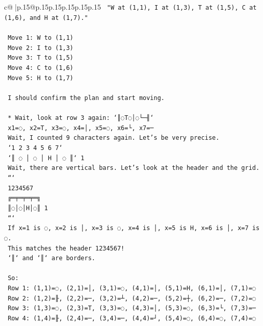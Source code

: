 \documentclass{article}
\begin{document}
{\begin{supertabular}{c@{$\;$}|p{.15\linewidth}@{}p{.15\linewidth}p{.15\linewidth}p{.15\linewidth}p{.15\linewidth}p{.15\linewidth}}
{{{\texttt{        "W at (1,1), I at (1,3), T at (1,5), C at (1,6), and H at (1,7)."} \\
\\ 
\texttt{        Move 1: W to (1,1)} \\
\texttt{        Move 2: I to (1,3)} \\
\texttt{        Move 3: T to (1,5)} \\
\texttt{        Move 4: C to (1,6)} \\
\texttt{        Move 5: H to (1,7)} \\
\\ 
\texttt{        I should confirm the plan and start moving.} \\
\\ 
\texttt{    *   Wait, look at row 3 again: `║◌T◌│◌└─╢`} \\
\texttt{        x1=◌, x2=T, x3=◌, x4=│, x5=◌, x6=└, x7=─} \\
\texttt{        Wait, I counted 9 characters again. Let's be very precise.} \\
\texttt{        `1 2 3 4 5 6 7`} \\
\texttt{        `║ ◌ │ ◌ │ H │ ◌ ║` 1} \\
\texttt{        Wait, there are vertical bars. Let's look at the header and the grid.} \\
\texttt{        ```} \\
\texttt{         1234567} \\
\texttt{        ╔═╤═╤═╤═╗} \\
\texttt{        ║◌│◌│H│◌║ 1} \\
\texttt{        ```} \\
\texttt{        If x=1 is ◌, x=2 is │, x=3 is ◌, x=4 is │, x=5 is H, x=6 is │, x=7 is ◌.} \\
\texttt{        This matches the header 1234567!} \\
\texttt{        `║` and `║` are borders.} \\
\\ 
\texttt{        So:} \\
\texttt{        Row 1: (1,1)=◌, (2,1)=│, (3,1)=◌, (4,1)=│, (5,1)=H, (6,1)=│, (7,1)=◌} \\
\texttt{        Row 2: (1,2)=╟, (2,2)=─, (3,2)=┴, (4,2)=─, (5,2)=┼, (6,2)=─, (7,2)=◌} \\
\texttt{        Row 3: (1,3)=◌, (2,3)=T, (3,3)=◌, (4,3)=│, (5,3)=◌, (6,3)=└, (7,3)=─} \\
\texttt{        Row 4: (1,4)=╟, (2,4)=─, (3,4)=─, (4,4)=┘, (5,4)=◌, (6,4)=◌, (7,4)=◌} \\
}}}
\end{supertabular}}
\end{document}
